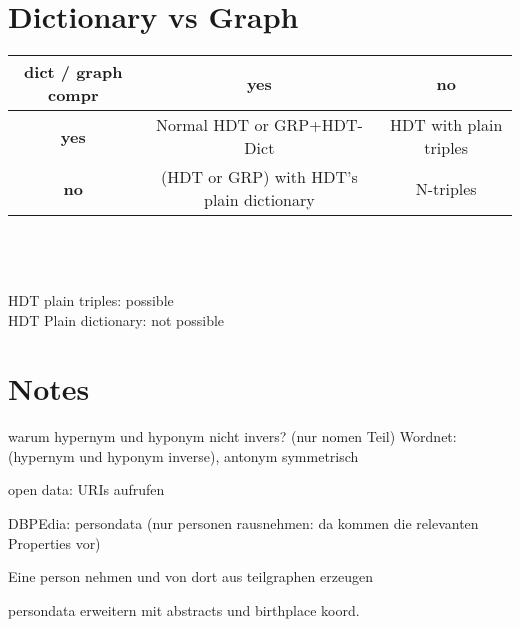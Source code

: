 \documentclass[a4paper]{scrartcl}
\begin{document}
\section{Dictionary vs Graph}

\begin{tabular}{|c|c|c|}
	\hline 
	\textbf{dict  / graph compr }& \textbf{yes} & \textbf{no} \\ 
	\hline 
	\textbf{yes} & Normal HDT or GRP+HDT-Dict & HDT with plain triples \\ 
	\hline 
	\textbf{no} & (HDT or GRP) with HDT's plain dictionary  & N-triples \\ 
	\hline 
\end{tabular} 
\\\\\\HDT plain triples: possible\\
HDT Plain dictionary: not possible

\section{Notes}

warum hypernym und hyponym nicht invers? (nur nomen Teil)
Wordnet: (hypernym und hyponym inverse), antonym symmetrisch

open data: URIs aufrufen



DBPEdia: persondata (nur personen rausnehmen: da kommen die relevanten Properties vor)

Eine person nehmen und von dort aus teilgraphen erzeugen

persondata erweitern mit abstracts und birthplace koord.
\end{document}
